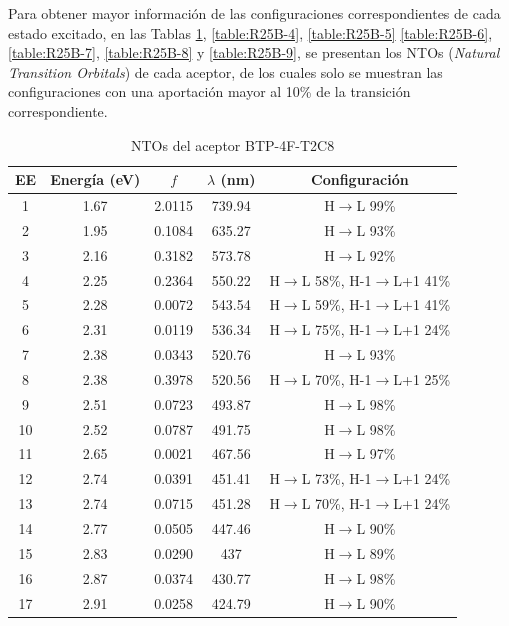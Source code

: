 Para obtener mayor información de las configuraciones correspondientes de cada estado excitado, en las Tablas \ref{table:R25B-3}, \ref{table:R25B-4}, \ref{table:R25B-5} \ref{table:R25B-6}, \ref{table:R25B-7}, \ref{table:R25B-8} y \ref{table:R25B-9}, se presentan los NTOs (\textit{Natural Transition Orbitals}) de cada aceptor, de los cuales solo se muestran las configuraciones con una aportación mayor al 10\% de la transición correspondiente.  
\begin{table}[H] %
\caption{NTOs del aceptor BTP-4F-T2C8}
\label{table:R25B-3} \vspace{-0.5cm}
{\footnotesize
\begin{center} 
\begin{tabular}{ccccc}
\hline
EE & Energía (eV) & $f$ & $\lambda$ (nm) & Configuración \\ \hline
1 & 1.67 & 2.0115 & 739.94 &  H$\rightarrow$L 99\% \\ 
2 & 1.95 & 0.1084 & 635.27  & H$\rightarrow$L 93\% \\ 
3 & 2.16 & 0.3182 & 573.78 & H$\rightarrow$L 92\% \\
4 & 2.25 & 0.2364 & 550.22 & H$\rightarrow$L 58\%, H-1$\rightarrow$L+1 41\% \\  
5 & 2.28 & 0.0072 & 543.54 &H$\rightarrow$L 59\%, H-1$\rightarrow$L+1 41\% \\
6 &  2.31 & 0.0119 & 536.34 & H$\rightarrow$L 75\%, H-1$\rightarrow$L+1 24\% \\
7 & 2.38 & 0.0343 & 520.76 & H$\rightarrow$L 93\% \\ 
8 & 2.38 & 0.3978 & 520.56 & H$\rightarrow$L 70\%, H-1$\rightarrow$L+1 25\% \\ 
9 & 2.51 & 0.0723 & 493.87 & H$\rightarrow$L 98\% \\ 
10 & 2.52 & 0.0787 & 491.75 & H$\rightarrow$L 98\% \\ 
11 & 2.65 & 0.0021 & 467.56 & H$\rightarrow$L 97\% \\ 
12 & 2.74 & 0.0391 & 451.41 & H$\rightarrow$L 73\%, H-1$\rightarrow$L+1 24\% \\
13 & 2.74 & 0.0715 & 451.28 & H$\rightarrow$L 70\%, H-1$\rightarrow$L+1 24\% \\
14 & 2.77 & 0.0505 & 447.46 & H$\rightarrow$L 90\% \\
15 & 2.83 & 0.0290 & 437 & H$\rightarrow$L 89\% \\
16 & 2.87 & 0.0374 & 430.77 & H$\rightarrow$L 98\% \\ 
17 & 2.91 & 0.0258 & 424.79 & H$\rightarrow$L 90\% \\ 

\end{tabular}
\end{center}}
\end{table}
